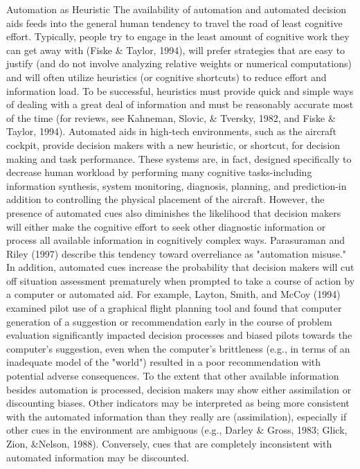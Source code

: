 \documentclass[utf8,bachelor,manualbib]{gradu3}
\begin{document}
Automation as Heuristic
The availability of automation and automated decision aids feeds into the general
human tendency to travel the road of least cognitive effort. Typically, people try to
engage in the least amount of cognitive work they can get away with (Fiske \&
Taylor, 1994), will prefer strategies that are easy to justify (and do not involve
analyzing relative weights or numerical computations) and will often utilize heuristics
(or cognitive shortcuts) to reduce effort and information load. To be successful,
heuristics must provide quick and simple ways of dealing with a great deal of
information and must be reasonably accurate most of the time (for reviews, see
Kahneman, Slovic, \& Tversky, 1982, and Fiske \& Taylor, 1994). Automated aids in high-tech environments, such as the aircraft cockpit, provide
decision makers with a new heuristic, or shortcut, for decision making and task
performance. These systems are, in fact, designed specifically to decrease human
workload by performing many cognitive tasks-including information synthesis,
system monitoring, diagnosis, planning, and prediction-in addition to controlling
the physical placement of the aircraft. However, the presence of automated cues
also diminishes the likelihood that decision makers will either make the cognitive
effort to seek other diagnostic information or process all available information in
cognitively complex ways. Parasuraman and Riley (1997) describe this tendency
toward overreliance as "automation misuse." In addition, automated cues increase
the probability that decision makers will cut off situation assessment prematurely
when prompted to take a course of action by a computer or automated aid. For
example, Layton, Smith, and McCoy (1994) examined pilot use of a graphical flight
planning tool and found that computer generation of a suggestion or recommendation
early in the course of problem evaluation significantly impacted decision
processes and biased pilots towards the computer's suggestion, even when the
computer's brittleness (e.g., in terms of an inadequate model of the "world")
resulted in a poor recommendation with potential adverse consequences.
To the extent that other available information besides automation is processed,
decision makers may show either assimilation or discounting biases. Other indicators
may be interpreted as being more consistent with the automated information
than they really are (assimilation), especially if other cues in the environment are
ambiguous (e.g., Darley \& Gross, 1983; Glick, Zion, \&Nelson, 1988). Conversely,
cues that are completely inconsistent with automated information may be discounted.
\end{document}
